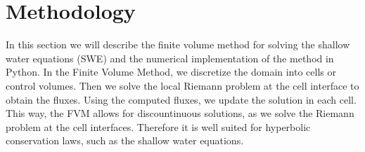 \chapter{Methodology}

In this section we will describe the finite volume method for solving the shallow water equations (SWE) and the numerical implementation of the method in Python.
In the Finite Volume Method, we discretize the domain into cells or control volumes.
Then we solve the local Riemann problem at the cell interface to obtain the fluxes.
Using the computed fluxes, we update the solution in each cell.
This way, the FVM allows for discountinuous solutions, as we solve the Riemann problem at the cell interfaces.
Therefore it is well suited for hyperbolic conservation laws, such as the shallow water equations.










